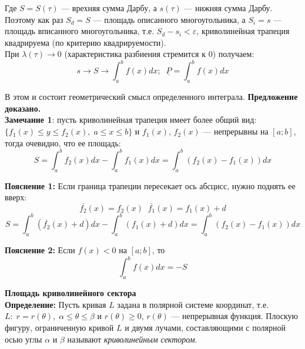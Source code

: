 \documentclass{article}
\begin{document}
  Где $S=S(\tau)$ --- врехняя сумма Дарбу, а $s(\tau)$ --- нижняя сумма Дарбу. Поэтому как раз $S_d=S$ --- площадь описанного многоугольника, а $S_i=s$ --- площадь вписанного многоугольника, т.е. $S_d-s_i<\varepsilon$, криволинейная трапеция квадрируема (по критерию квадрируемости).\\
  
  При $\lambda(\tau)\rightarrow 0$ (характеристика разбиения стремится к $0$) получаем:
  \begin{equation}
    s\rightarrow S\rightarrow \int_a^b f(x)dx; \;\; \underline P=\int_a^b f(x)dx
  \end{equation}
  
  В этом и состоит геометрический смысл определенного интеграла. \textbf{Предложение доказано.}\\
  
  \textbf{Замечание 1}: пусть криволинейная трапеция имеет более общий вид: $\{f_1(x)\leq y\leq f_2(x),\;a\leq x\leq b\}$ и $f_1(x)$, $f_2(x)$ --- непрерывны на $[a;b]$, тогда очевидно, что ее площадь:
  \begin{equation}
    S=\int_a^bf_2(x)dx-\int_a^bf_1(x)dx=\int_a^b(f_2(x)-f_1(x))dx
  \end{equation}
  
  \textbf{Пояснение 1:} Если граница трапеции пересекает ось абсцисс, нужно поднять ее вверх:
  \begin{equation}
    \overline{f_2}(x)=f_2(x)\;\;\overline{f_1}(x)=f_1(x)+d
  \end{equation}
  \begin{equation}
    S=\int_a^b(\overline{f_2}(x)+d)dx-\int_a^b(f_1(x)+d)dx=\int_a^b(f_2(x)-f_1(x))dx
  \end{equation}
  
  \textbf{Пояснение 2:} Если $f(x)<0$ на $[a;b]$, то
  \begin{equation}
    \int_a^bf(x)dx=-S
  \end{equation}
  
  \large\textbf{Площадь криволинейного сектора}\normalsize\\
  
  \textbf{Определение:} Пусть кривая $L$ задана в полярной системе координат, т.е. $L:\;r=r(\theta),\;\alpha\leq\theta\leq\beta$ и $r(\theta)\geq0$, $r(\theta)$ --- непрерывная функция. Плоскую фигуру, ограниченную кривой $L$ и двумя лучами, составляющими с полярной осью углы $\alpha$ и $\beta$ называют \textit{криволинейным сектором}.\\
  
\end{document}
